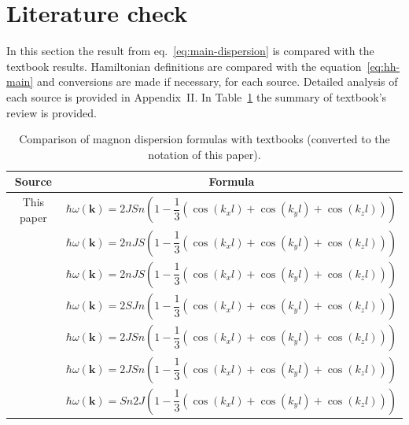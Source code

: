 \documentclass[a4paper,12pt]{article}
\begin{document}
    \section{Literature check}
        In this section the result from eq.~\eqref{eq:main-dispersion} is compared with the textbook results. 
        Hamiltonian definitions are compared with the equation~\eqref{eq:hh-main} and conversions are made if necessary, for each source. 
        Detailed analysis of each source is provided in Appendix~II. In Table~\ref{tab:literature-review} the summary of textbook's review is provided.

        \begin{table}[H]
            \centering
            \caption{Comparison of magnon dispersion formulas with textbooks (converted to the notation of this paper).}
            \label{tab:literature-review}
            \def\arraystretch{2.5}
            \begin{tabular}{|c|c|}
                \hline
                Source                             & Formula                                                                                                        \\ \hline
                This paper                         & $\hbar\omega(\mathbf{k}) = 2JSn\left(1 - \dfrac{1}{3}\left(\cos(k_xl) + \cos(k_yl) + \cos(k_zl)\right)\right)$ \\ \hline
                \cite{rezende2020fundamentals}     & $\hbar\omega(\mathbf{k}) = 2nJS\left(1 - \dfrac{1}{3}\left(\cos(k_xl) + \cos(k_yl) + \cos(k_zl)\right)\right)$ \\ \hline
                \cite{blundell2003magnetism}       & $\hbar\omega(\mathbf{k}) = 2nJS\left(1 - \dfrac{1}{3}\left(\cos(k_xl) + \cos(k_yl) + \cos(k_zl)\right)\right)$ \\ \hline
                \cite{gurevich1996magnetization}   & $\hbar\omega(\mathbf{k}) = 2SJn\left(1 - \dfrac{1}{3}\left(\cos(k_xl) + \cos(k_yl) + \cos(k_zl)\right)\right)$ \\ \hline
                \cite{simon2013oxford}             & $\hbar\omega(\mathbf{k}) = 2JSn\left(1 - \dfrac{1}{3}\left(\cos(k_xl) + \cos(k_yl) + \cos(k_zl)\right)\right)$ \\ \hline
                \cite{coey2010magnetism}           & $\hbar\omega(\mathbf{k}) = 2JSn\left(1 - \dfrac{1}{3}\left(\cos(k_xl) + \cos(k_yl) + \cos(k_zl)\right)\right)$ \\ \hline
                \cite{jensen1991rare}              & $\hbar\omega(\mathbf{k}) = Sn2J\left(1 - \dfrac{1}{3}\left(\cos(k_xl) + \cos(k_yl) + \cos(k_zl)\right)\right)$ \\ \hline
            \end{tabular}
        \end{table}
\end{document}
